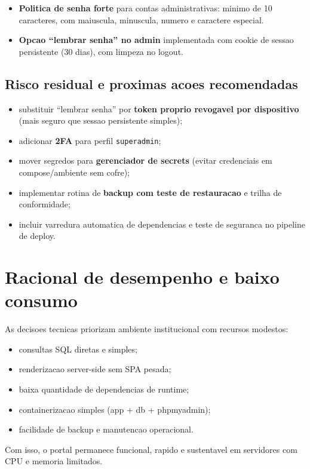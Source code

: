 \documentclass[12pt,a4paper]{article}
\begin{document}
\begin{itemize}
\begin{itemize}
        \item \texttt{X-Content-Type-Options}
        \item \texttt{Referrer-Policy}
        \item \texttt{Permissions-Policy}
        \item \texttt{Content-Security-Policy}
        \item \texttt{Strict-Transport-Security} (quando HTTPS)
    \end{itemize}
    \item \textbf{Politica de senha forte} para contas administrativas:
    minimo de 10 caracteres, com maiuscula, minuscula, numero e caractere especial.
    \item \textbf{Opcao ``lembrar senha'' no admin} implementada com cookie de sessao persistente (30 dias), com limpeza no logout.
\end{itemize}

\subsection{Risco residual e proximas acoes recomendadas}
\begin{itemize}
    \item substituir ``lembrar senha'' por \textbf{token proprio revogavel por dispositivo} (mais seguro que sessao persistente simples);
    \item adicionar \textbf{2FA} para perfil \texttt{superadmin};
    \item mover segredos para \textbf{gerenciador de secrets} (evitar credenciais em compose/ambiente sem cofre);
    \item implementar rotina de \textbf{backup com teste de restauracao} e trilha de conformidade;
    \item incluir varredura automatica de dependencias e teste de seguranca no pipeline de deploy.
\end{itemize}

\section{Racional de desempenho e baixo consumo}
As decisoes tecnicas priorizam ambiente institucional com recursos modestos:
\begin{itemize}
    \item consultas SQL diretas e simples;
    \item renderizacao server-side sem SPA pesada;
    \item baixa quantidade de dependencias de runtime;
    \item containerizacao simples (app + db + phpmyadmin);
    \item facilidade de backup e manutencao operacional.
\end{itemize}
Com isso, o portal permanece funcional, rapido e sustentavel em servidores com CPU e memoria limitados.
\end{document}
